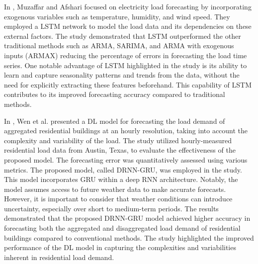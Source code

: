 In \cite{MUZAFFAR20192922}, Muzaffar and Afshari focused on electricity load forecasting by incorporating exogenous variables such as temperature, humidity, and wind speed.
They employed a LSTM network to model the load data and its dependencies on these external factors.
The study demonstrated that LSTM outperformed the other traditional methods such as ARMA, SARIMA, and ARMA with exogenous inputs (ARMAX) reducing the percentage of errors in forecasting the load time series.
One notable advantage of LSTM highlighted in the study is its ability to learn and capture seasonality patterns and trends from the data, without the need for explicitly extracting these features beforehand.
This capability of LSTM contributes to its improved forecasting accuracy compared to traditional methods.

In \cite{WEN2020106073}, Wen et al. presented a DL model for forecasting the load demand of aggregated residential buildings at an hourly resolution, taking into account the complexity and variability of the load.
The study utilized hourly-measured residential load data from Austin, Texas, to evaluate the effectiveness of the proposed model.
The forecasting error was quantitatively assessed using various metrics.
The proposed model, called DRNN-GRU, was employed in the study.
This model incorporates GRU within a deep RNN architecture.
Notably, the model assumes access to future weather data to make accurate forecasts.
However, it is important to consider that weather conditions can introduce uncertainty, especially over short to medium-term periods.
The results demonstrated that the proposed DRNN-GRU model achieved higher accuracy in forecasting both the aggregated and disaggregated load demand of residential buildings compared to conventional methods.
The study highlighted the improved performance of the DL model in capturing the complexities and variabilities inherent in residential load demand.

